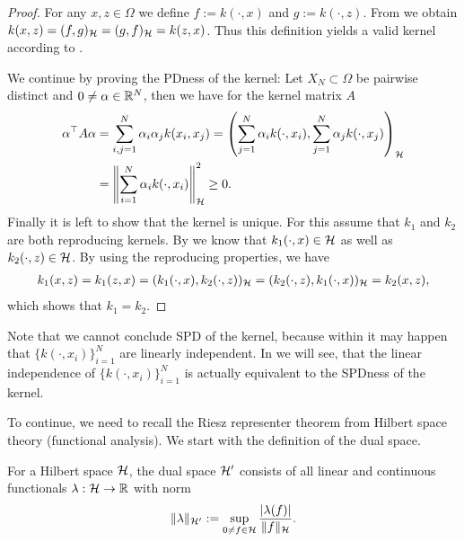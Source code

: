 \begin{proof}
For any $x, z \in \Omega$ we define $f := k(\cdot, x)$ and $g := k(\cdot, z)$.
From  we obtain $k(x, z) = (f, g)_{\mathcal{H}} = (g, f)_{\mathcal{H}} = k(z, x)$.
Thus this definition yields a valid kernel according to .

We continue by proving the PDness of the kernel:
Let $X_N \subset \Omega$ be pairwise distinct and $0 \neq \alpha \in \mathbb{R}^N$, then we have for the kernel matrix $A$
\begin{align}
\label{eq:proof_calc_1}
\begin{aligned}
\alpha^\top A \alpha &= \sum_{i,j=1}^N \alpha_i \alpha_j k(x_i, x_j) = \left( \sum_{j=1}^N \alpha_i k(\cdot, x_i), \sum_{j=1}^N \alpha_j k(\cdot, x_j) \right)_{\mathcal{H}} \\
&= \left \Vert \sum_{i=1}^N \alpha_i k(\cdot, x_i) \right \Vert_{\mathcal{H}}^2 \geq 0.
\end{aligned}
\end{align}
Finally it is left to show that the kernel is unique.
For this assume that $k_1$ and $k_2$ are both reproducing kernels. 
By  we know that $k_1(\cdot, x) \in \mathcal{H}$ as well as $k_2(\cdot, z) \in \mathcal{H}$.
By using the reproducing properties, we have
\begin{align*}
k_1(x, z) = k_1(z, x) = (k_1(\cdot, x), k_2(\cdot, z))_{\mathcal{H}} = (k_2(\cdot, z), k_1(\cdot, x))_{\mathcal{H}} = k_2(x, z),
\end{align*}
which shows that $k_1 = k_2$.
\end{proof}


Note that we cannot conclude SPD of the kernel, because within  it may happen that $\{ k(\cdot, x_i) \}_{i=1}^N$ are linearly independent.
In  we will see, 
that the linear independence of $\{ k(\cdot, x_i) \}_{i=1}^N$ is actually equivalent to the SPDness of the kernel.


To continue, we need to recall the Riesz representer theorem from Hilbert space theory (functional analysis).
We start with the definition of the dual space.

\begin{definition}
For a Hilbert space $\mathcal{H}$, the dual space $\mathcal{H}'$ consists of all linear and continuous functionals $\lambda: \mathcal{H} \rightarrow \mathbb{R}$ with norm
\begin{align*}
\Vert \lambda \Vert_{\mathcal{H}'} := \sup_{0 \neq f \in \mathcal{H}} \frac{|\lambda(f)|}{\Vert f \Vert_{\mathcal{H}}}.
\end{align*}
\end{definition}

